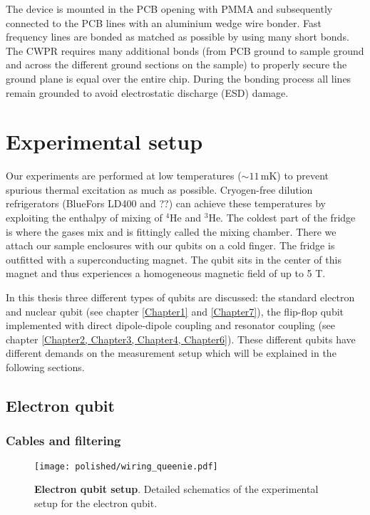 The device is mounted in the PCB opening with PMMA and subsequently connected to the PCB lines with an aluminium wedge wire bonder. Fast frequency lines are bonded as matched as possible by using many short bonds. The CWPR requires many additional bonds (from PCB ground to sample ground and across the different ground sections on the sample) to properly secure the ground plane is equal over the entire chip. During the bonding process all lines remain grounded to avoid electrostatic discharge (ESD) damage. 

\section{Experimental setup} \label{sec:setup}

Our experiments are performed at low temperatures ($\sim 11\,$mK) to prevent spurious thermal excitation as much as possible. Cryogen-free dilution refrigerators (BlueFors LD400 and ??) can achieve these temperatures by  exploiting the enthalpy of mixing of $^4$He and $^3$He. The coldest part of the fridge is where the gases mix and is fittingly called the mixing chamber. There we attach our sample enclosures with our qubits on a cold finger. The fridge is outfitted with a superconducting magnet. The qubit sits in the center of this magnet and thus experiences a homogeneous magnetic field of up to 5 T.

In this thesis three different types of qubits are discussed: the standard electron and nuclear qubit (see chapter \ref{Chapter1} and \ref{Chapter7}), the flip-flop qubit implemented with direct dipole-dipole coupling and resonator coupling (see chapter \ref{Chapter2, Chapter3, Chapter4, Chapter6}). These different qubits have different demands on the measurement setup which will be explained in the following sections. 

\subsection{Electron qubit} \label{sec:setup_en}

\subsubsection{Cables and filtering}

\begin{figure}
	\centering
	\texttt{[image: polished/wiring\_queenie.pdf]}
	\caption[Electron qubit setup]{\textbf{Electron qubit setup}. Detailed schematics of the experimental setup for the electron qubit.  }
	\label{fig:queenie_setup}
\end{figure}

